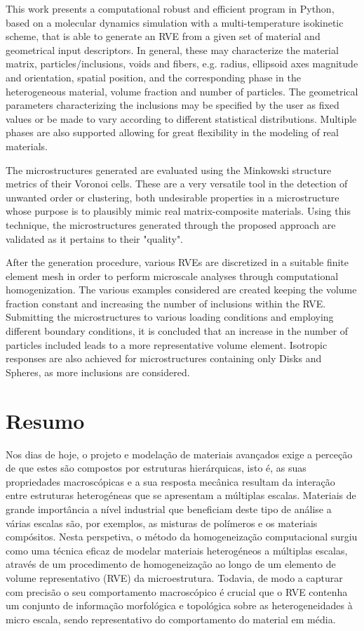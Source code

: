 \documentclass[a4paper, openright, twoside]{report}
\begin{document}
This work presents a computational robust and efficient program in Python, based on a molecular dynamics simulation with a multi-temperature isokinetic scheme, that is able to generate an RVE from a given set of material and geometrical input descriptors.
In general, these may characterize the material matrix, particles/inclusions, voids and fibers, e.g. radius, ellipsoid axes magnitude and orientation, spatial position, and the corresponding phase in the heterogeneous material, volume fraction and number of particles.
The geometrical parameters characterizing the inclusions may be specified by the user as fixed values or be made to vary according to different statistical distributions.
Multiple phases are also supported allowing for great flexibility in the modeling of real materials.

The microstructures generated are evaluated using the Minkowski structure metrics of their Voronoi cells.
These are a very versatile tool in the detection of unwanted order or clustering, both undesirable properties in a microstructure whose purpose is to plausibly mimic real matrix-composite materials.
Using this technique, the microstructures generated through the proposed approach are validated as it pertains to their "quality".

After the generation procedure, various RVEs are discretized in a suitable finite element mesh in order to perform microscale analyses through computational homogenization.
The various examples considered are created keeping the volume fraction constant and increasing the number of inclusions within the RVE.
Submitting the microstructures to various loading conditions and employing different boundary conditions, it is concluded that an increase in the number of particles included leads to a more representative volume element.
Isotropic responses are also achieved for microstructures containing only Disks and Spheres, as more inclusions are considered.

\newpage\null\thispagestyle{blank}\newpage

\chapter*{Resumo}

Nos dias de hoje, o projeto e modelação de materiais avançados exige a perceção de que estes são compostos por estruturas hierárquicas, isto é, as suas propriedades ma\-cros\-có\-pi\-cas e a sua resposta mecânica resultam da interação entre estruturas heterogéneas que se apresentam a múltiplas escalas.
Materiais de grande importância a nível industrial que beneficiam deste tipo de análise a várias escalas são, por exemplos, as misturas de polímeros e os materiais compósitos.
Nesta perspetiva, o método da homogeneização computacional surgiu como uma técnica eficaz de modelar materiais heterogéneos a múltiplas escalas, através de um procedimento de homogeneização ao longo de um elemento de volume representativo (RVE) da microestrutura.
Todavia, de modo a capturar com precisão o seu comportamento macroscópico é crucial que o RVE contenha um conjunto de informação morfológica e topológica sobre as heterogeneidades à micro escala, sendo representativo do comportamento do material em média.
\end{document}
